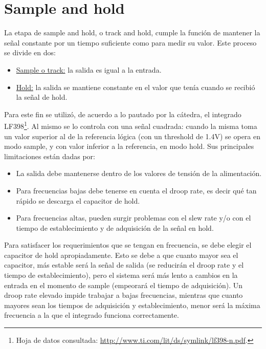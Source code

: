 \documentclass{article}
\begin{document}
\section{Sample and hold}
La etapa de sample and hold, o track and hold, cumple la funci\'on de mantener la se\~nal constante por un tiempo suficiente como para medir su valor. Este proceso se divide en dos:
\begin{itemize}     
	\item \underline{Sample o track:} la salida es igual a la entrada.     
	\item \underline{Hold:} la salida se mantiene constante en el valor que ten\'ia cuando se recibi\'o la se\~nal de hold. 
\end{itemize}

Para este fin se utiliz\'o, de acuerdo a lo pautado por la c\'atedra, el integrado LF398\footnote{Hoja de datos consultada: \url{http://www.ti.com/lit/ds/symlink/lf398-n.pdf}.}. Al mismo se lo controla con una se\~nal cuadrada: cuando la misma toma un valor superior al de la referencia l\'ogica (con un threshold de 1.4V) se opera en modo sample, y con valor inferior a la referencia, en modo hold. Sus principales limitaciones est\'an dadas por:    
\begin{itemize}      
	\item La salida debe mantenerse dentro de los valores de tensi\'on de la alimentaci\'on.      
	\item Para frecuencias bajas debe tenerse en cuenta el droop rate, es decir qu\'e tan r\'apido se descarga el capacitor de hold.      
	\item Para frecuencias altas, pueden surgir problemas con el slew rate y/o con el tiempo de establecimiento  y de adquisici\'on de la se\~nal en hold.   
\end{itemize}   

Para satisfacer los requerimientos que se tengan en frecuencia, se debe elegir el capacitor de hold apropiadamente. Esto se debe a que cuanto mayor sea el capacitor, m\'as estable ser\'a la se\~nal de salida (se reducir\'an el droop rate y el tiempo de establecimiento), pero el sistema ser\'a m\'as lento a cambios en la entrada en el momento de sample (empeorar\'a el tiempo de adquisici\'on). Un droop rate elevado impide trabajar a bajas frecuencias, mientras que cuanto mayores sean los tiempos de adquisici\'on y establecimiento, menor ser\'a la m\'axima frecuencia a la que el integrado funciona correctamente. \par
\end{document}
